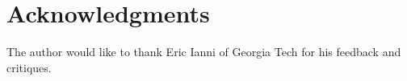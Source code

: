 \section{Acknowledgments}
The author would like to thank Eric Ianni of Georgia Tech for his feedback
and critiques.
